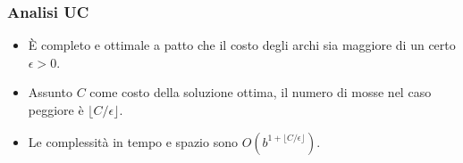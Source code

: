 \subsubsection{Analisi UC}
\begin{itemize}
	\item \`E completo e ottimale a patto che il costo degli archi sia maggiore di un certo
	      $\epsilon > 0$.
	\item Assunto $C$ come costo della soluzione ottima, il numero di mosse nel caso peggiore \`e
	      $\lfloor C/\epsilon \rfloor$.
	\item Le complessit\`a in tempo e spazio sono $O(b^{1+\lfloor C/\epsilon \rfloor})$.
\end{itemize}
